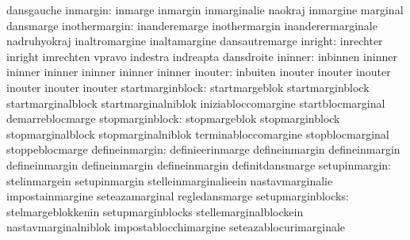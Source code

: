                                   dansgauche
                        inmargin: inmarge                          inmargin
                                  inmarginalie                     naokraj
                                  inmargine                        marginal
                                  dansmarge
                   inothermargin: inanderemarge                    inothermargin
                                  inanderermarginale               nadruhyokraj
                                  inaltromargine                   inaltamargine
                                  dansautremarge
                         inright: inrechter                        inright
                                  imrechten                        vpravo
                                  indestra                         indreapta
                                  dansdroite
                         ininner: inbinnen ininner
                                  ininner  ininner
                                  ininner  ininner
                                  ininner
                         inouter: inbuiten inouter
                                  inouter  inouter
                                  inouter  inouter
                                  inouter
                startmarginblock: startmargeblok                   startmarginblock
                                  startmarginalblock               startmarginalniblok
                                  iniziabloccomargine              startblocmarginal
                                  demarreblocmarge
                 stopmarginblock: stopmargeblok                    stopmarginblock
                                  stopmarginalblock                stopmarginalniblok
                                  terminabloccomargine             stopblocmarginal
                                  stoppeblocmarge
                  defineinmargin: definieerinmarge defineinmargin
                                  defineinmargin   defineinmargin
                                  defineinmargin   defineinmargin
                                  definitdansmarge
                   setupinmargin: stelinmargein                    setupinmargin
                                  stelleinmarginalieein            nastavmarginalie
                                  impostainmargine                 seteazamarginal
                                  regledansmarge
               setupmarginblocks: stelmargeblokkenin               setupmarginblocks
                                  stellemarginalblockein           nastavmarginalniblok
                                  impostablocchimargine            seteazablocurimarginale
